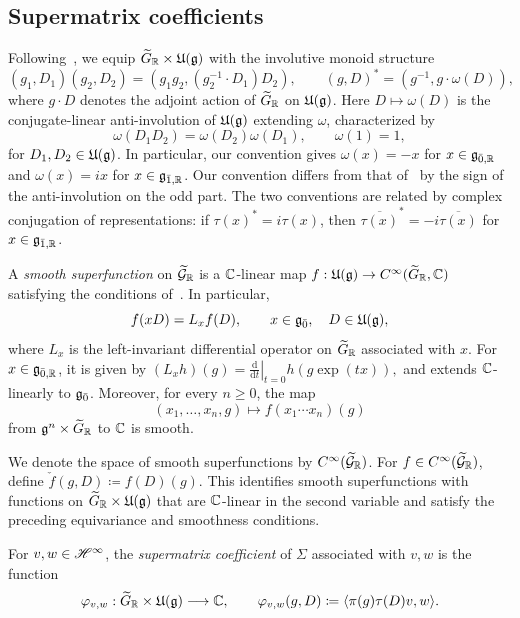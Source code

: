 \subsection{Supermatrix coefficients}

Following~\cite[Section~6.2]{NeebSalmasian}, we equip $\widetilde{G}_{{\mathbb R}}\times{\mathfrak U}({\mathfrak{g}})$ with the involutive monoid structure
\begin{equation}
(g_1,D_1)(g_2,D_2)
=
(g_1g_2,(g_2^{-1}\cdot D_1)D_2),
\qquad
(g,D)^\ast
=
(g^{-1},g\cdot \omega(D)),
\end{equation}
where $g\cdot D$ denotes the adjoint action of $\widetilde{G}_{{\mathbb R}}$ on ${\mathfrak U}({\mathfrak{g}})$. Here $D\mapsto \omega(D)$ is the conjugate-linear anti-involution of ${\mathfrak U}({\mathfrak{g}})$ extending $\omega$, characterized by
\begin{equation}
\omega(D_1D_2)=\omega(D_2)\omega(D_1),
\qquad
\omega(1)=1,
\end{equation}
for $D_1,D_2\in{\mathfrak U}({\mathfrak{g}})$. In particular, our convention gives $\omega(x)=-x$ for $x\in{\mathfrak{g}}_{\bar0,{\mathbb R}}$ and $\omega(x)=ix$ for $x\in{\mathfrak{g}}_{\bar1,{\mathbb R}}$. Our convention differs from that of~\cite{NeebSalmasian} by the sign of the anti-involution on the odd part. The two conventions are related by complex conjugation of representations: if $\tau(x)^\ast=i\tau(x)$, then $\overline{\tau(x)}^\ast=-i\overline{\tau(x)}$ for $x\in{\mathfrak{g}}_{\bar1,{\mathbb R}}$.


A \emph{smooth superfunction} on $\widetilde{{\mathcal{G}}}_{{\mathbb R}}$ is a ${\mathbb C}$-linear map
$f:{\mathfrak U}({\mathfrak{g}})\to C^\infty(\widetilde{G}_{{\mathbb R}},{\mathbb C})$
satisfying the conditions of~\cite[Section~6.3]{NeebSalmasian}. In particular,
\[
f(xD)=L_xf(D),
\qquad
x\in{\mathfrak{g}_{\bar{0}}},\quad D\in{\mathfrak U}({\mathfrak{g}}),
\]
where $L_x$ is the left-invariant differential operator on $\widetilde{G}_{{\mathbb R}}$ associated with $x$. For $x\in{\mathfrak{g}}_{\bar0,{\mathbb R}}$, it is given by
$
(L_xh)(g)=\left.\frac{\mathrm d}{\mathrm dt}\right|_{t=0}h(g\exp(tx)),
$
and extends ${\mathbb C}$-linearly to ${\mathfrak{g}_{\bar{0}}}$. Moreover, for every $n\geq0$, the map
\[
(x_1,\ldots,x_n,g)
\longmapsto
f(x_1\cdots x_n)(g)
\]
from ${\mathfrak{g}}^n\times\widetilde{G}_{{\mathbb R}}$ to ${\mathbb C}$ is smooth.

We denote the space of smooth superfunctions by $C^\infty(\widetilde{{\mathcal{G}}}_{{\mathbb R}})$. For $f\in C^\infty(\widetilde{{\mathcal{G}}}_{{\mathbb R}})$, define
$
\check f(g,D)\coloneqq f(D)(g).
$
This identifies smooth superfunctions with functions on $\widetilde{G}_{{\mathbb R}}\times{\mathfrak U}({\mathfrak{g}})$ that are ${\mathbb C}$-linear in the second variable and satisfy the preceding equivariance and smoothness conditions.

\begin{definition}
For $v,w\in{\mathscr{H}}^\infty$, the \emph{supermatrix coefficient} of $\Sigma$ associated with $v,w$ is the function
\begin{equation*}
\varphi_{v,w}:\widetilde{G}_{{\mathbb R}}\times{\mathfrak U}({\mathfrak{g}})\longrightarrow{\mathbb C},
\qquad
\varphi_{v,w}(g,D)
\coloneqq
\langle\pi(g)\tau(D)v,w\rangle.
\end{equation*}
\end{definition}

